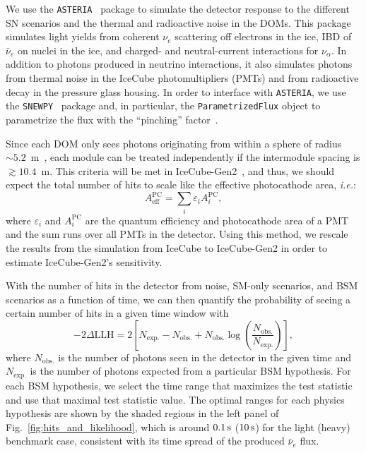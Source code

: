 \documentclass[aps,twocolumn,prl,showpacs,showkeys,preprintnumbers,superscriptaddress,nobibnotes,floatfix,longbibliography,notitlepage,nofootinbib]{revtex4-2}
\begin{document}
We use the \texttt{ASTERIA}~\cite{spencer_griswold_2020_3926835} package to simulate the detector response to the different SN scenarios and the thermal and radioactive noise in the DOMs.
This package simulates light yields from coherent $\nu_{e}$ scattering off electrons in the ice, IBD of $\bar{\nu}_{e}$ on nuclei in the ice, and charged- and neutral-current interactions for $\nu_{\alpha}$. In addition to photons produced in neutrino interactions, it also simulates photons from thermal noise in the IceCube photomultipliers (PMTs) and from radioactive decay in the pressure glass housing.
In order to interface with \texttt{ASTERIA}, we use the \texttt{SNEWPY}~\cite{SNEWS:2021ewj} package and, in particular, the \texttt{ParametrizedFlux} object to parametrize the flux with the ``pinching'' factor~\cite{Keil:2002in,SNEWS:2021ewj}.

Since each DOM only sees photons originating from within a sphere of radius $\sim 5.2$~m~\cite{IceCube:2011cwc}, each module can be treated independently if the intermodule spacing is $\gtrsim10.4$~m.
This criteria will be met in IceCube-Gen2~\cite{IceCube-Gen2:2020qha}, and thus, we should expect the total number of hits to scale like the effective photocathode area, \textit{i.e.}:
$$
A_{\mathrm{eff}}^{\mathrm{PC}} = \sum_{i} \varepsilon_{i} A_{i}^{\mathrm{PC}},
$$
where $\varepsilon_{i}$ and $A_{i}^{\mathrm{PC}}$ are the quantum efficiency and photocathode area of a PMT and the sum runs over all PMTs in the detector.
Using this method, we rescale the results from the simulation from IceCube to IceCube-Gen2 in order to estimate IceCube-Gen2's sensitivity.

With the number of hits in the detector from noise, SM-only scenarios, and BSM scenarios as a function of time, we can then quantify the probability of seeing a certain number of hits in a given time window with
\begin{equation}
\label{eq:likelihood}
    -2\Delta\mathrm{LLH} = 2 \left[N_{\mathrm{exp.}} - N_{\mathrm{obs.}} + N_{\mathrm{obs.}}\log\left(\frac{N_{\mathrm{obs.}}}{N_{\mathrm{exp.}}}\right)\right],
\end{equation}
where $N_{\mathrm{obs.}}$ is the number of photons seen in the detector in the given time and $N_{\mathrm{exp.}}$ is the number of photons expected from a particular BSM hypothesis. 
For each BSM hypothesis, we select the time range that maximizes the test statistic and use that maximal test statistic value.
The optimal ranges for each physics hypothesis are shown by the shaded regions in the left panel of Fig.~\ref{fig:hits_and_likelihood}, which is around $\unit[0.1]{s}$ ($\unit[10]{s}$) for the light (heavy) benchmark case, consistent with its time spread of the produced $\bar{\nu}_e$ flux.
\end{document}
